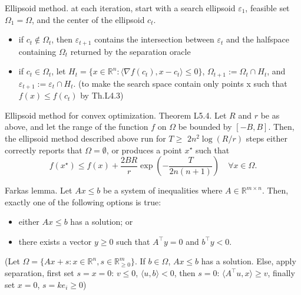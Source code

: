 \begin{remark}[L5.4]{Ellipsoid method.}
    at each iteration, start with a search ellipsoid $\varepsilon_1$, feasible set $\Omega_1 = \Omega$, and the center of the ellipsoid $c_t$.
    \begin{itemize}[leftmargin=*]
        \item if $c_t \notin \Omega_t$, then $\varepsilon_{t+1}$ contains the intersection between $\varepsilon_t$ and the halfspace containing $\Omega_t$ returned by the separation oracle
        \item if $c_t \in \Omega_t$, let $H_t = \{x \in \mathbb{R}^n : \langle \nabla f(c_t), x - c_t\rangle \leq 0\}$, $\Omega_{t+1} := \Omega_t \cap H_t$, and $\varepsilon_{t+1} := \varepsilon_t \cap H_t$. (to make the search space contain only points x such that $f(x) \leq f(c_t)$ by Th.L4.3)
    \end{itemize}
\end{remark}

\begin{theorem}[L5.4]{Ellipsoid method for convex optimization.}
    Theorem L5.4. Let $R$ and $r$ be as above, and let the range of the function $f$ on $\Omega$ be bounded by $[-B, B]$. Then, the ellipsoid method described above run for $T \geq$ $2 n^2 \log (R / r)$ steps either correctly reports that $\Omega=\emptyset$, or produces a point $x^{\star}$ such that
    \vspace{-4pt}\\
    {\footnotesize$$
    f\left(x^{\star}\right) \leq f(x)+\frac{2 B R}{r} \exp \left(-\frac{T}{2 n(n+1)}\right) \quad \forall x \in \Omega .
    $$}
    \vspace{-4pt}
\end{theorem}


\begin{theorem}[L6.1]{Farkas lemma.}
    Let $A x \leq b$ be a system of inequalities where $A \in \mathbb{R}^{m \times n}$. Then, exactly one of the following options is true:
    \begin{itemize}[leftmargin=*]
        \item either $A x \leq b$ has a solution; or
        \item there exists a vector $y \geq 0$ such that $A^{\top} y=0$ and $b^{\top} y<0$.
    \end{itemize}
    \vspace{-4pt}
    (Let $\Omega = \{Ax+s : x \in \mathbb{R}^n, s \in \mathbb{R}^m_{\geq0}\}$. If $b\in\Omega$, $Ax\leq b$ has a solution. Else, apply separation, first set $s=x=0$: $v\leq 0$, $\langle u,b \rangle < 0$, then $s=0$: $\langle A^\top u, x \rangle \geq v$, finally set $x=0$, $s=ke_i\geq0$)\\
\end{theorem}

